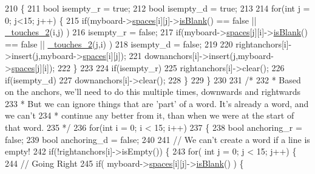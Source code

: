\begin{DoxyCode}
210         \{
211             \textcolor{keywordtype}{bool} isempty\_r = \textcolor{keyword}{true};
212             \textcolor{keywordtype}{bool} isempty\_d = \textcolor{keyword}{true};
213 
214             \textcolor{keywordflow}{for}(\textcolor{keywordtype}{int} j = 0; j<15; j++) \{
215                 \textcolor{keywordflow}{if}(myboard->\hyperlink{class_board_a73b12248ddb6ee3adc24f4458d8661c2}{spaces}[i][j]->\hyperlink{class_space_a308f0ef400183df78df69717ca50cfee}{isBlank}() == \textcolor{keyword}{false} || 
      \hyperlink{class_a_i_player_a158fb1339fc845f8b057d71b6e2f6381}{\_touches\_2}(i,j) )
216                     isempty\_r = \textcolor{keyword}{false};
217                 \textcolor{keywordflow}{if}(myboard->\hyperlink{class_board_a73b12248ddb6ee3adc24f4458d8661c2}{spaces}[j][i]->\hyperlink{class_space_a308f0ef400183df78df69717ca50cfee}{isBlank}() == \textcolor{keyword}{false} || 
      \hyperlink{class_a_i_player_a158fb1339fc845f8b057d71b6e2f6381}{\_touches\_2}(j,i) )
218                     isempty\_d = \textcolor{keyword}{false};
219 
220                 rightanchors[i]->insert(j,myboard->\hyperlink{class_board_a73b12248ddb6ee3adc24f4458d8661c2}{spaces}[i][j]);
221                 downanchors[i]->insert(j,myboard->\hyperlink{class_board_a73b12248ddb6ee3adc24f4458d8661c2}{spaces}[j][i]);
222             \}
223 
224             \textcolor{keywordflow}{if}(isempty\_r)
225                 rightanchors[i]->clear();
226             \textcolor{keywordflow}{if}(isempty\_d)
227                 downanchors[i]->clear();
228         \}
229     \}
230 
231     \textcolor{comment}{/*}
232 \textcolor{comment}{     * Based on the anchors, we'll need to do this multiple times, downwards and rightwards}
233 \textcolor{comment}{     * But we can ignore things that are 'part' of a word. It's already a word, and we can't}
234 \textcolor{comment}{     * continue any better from it, than when we were at the start of that word.}
235 \textcolor{comment}{     */}
236     \textcolor{keywordflow}{for}(\textcolor{keywordtype}{int} i = 0; i < 15; i++)
237     \{
238         \textcolor{keywordtype}{bool} anchoring\_r = \textcolor{keyword}{false};
239         \textcolor{keywordtype}{bool} anchoring\_d = \textcolor{keyword}{false};
240 
241         \textcolor{comment}{// We can't create a word if a line is empty!}
242         \textcolor{keywordflow}{if}(!rightanchors[i]->isEmpty()) \{
243             \textcolor{keywordflow}{for}( \textcolor{keywordtype}{int} j = 0; j < 15; j++) \{
244                 \textcolor{comment}{// Going Right}
245                 \textcolor{keywordflow}{if}( myboard->\hyperlink{class_board_a73b12248ddb6ee3adc24f4458d8661c2}{spaces}[i][j]->\hyperlink{class_space_a308f0ef400183df78df69717ca50cfee}{isBlank}() ) \{

\end{DoxyCode}
